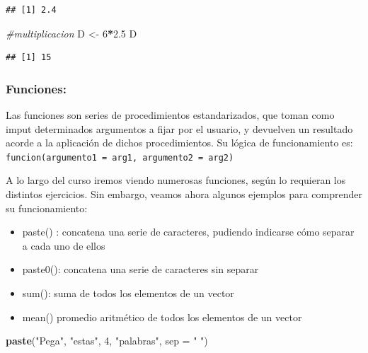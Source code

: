 \documentclass[]{book}
\newenvironment{Shaded}{\begin{snugshade}}{\end{snugshade}}
\newcommand{\CommentTok}[1]{\textcolor[rgb]{0.56,0.35,0.01}{\textit{#1}}}
\newcommand{\DataTypeTok}[1]{\textcolor[rgb]{0.13,0.29,0.53}{#1}}
\newcommand{\DecValTok}[1]{\textcolor[rgb]{0.00,0.00,0.81}{#1}}
\newcommand{\FloatTok}[1]{\textcolor[rgb]{0.00,0.00,0.81}{#1}}
\newcommand{\KeywordTok}[1]{\textcolor[rgb]{0.13,0.29,0.53}{\textbf{#1}}}
\newcommand{\NormalTok}[1]{#1}
\newcommand{\OperatorTok}[1]{\textcolor[rgb]{0.81,0.36,0.00}{\textbf{#1}}}
\newcommand{\StringTok}[1]{\textcolor[rgb]{0.31,0.60,0.02}{#1}}
\providecommand{\tightlist}{%
  \setlength{\itemsep}{0pt}\setlength{\parskip}{0pt}}
\begin{document}
\begin{verbatim}
## [1] 2.4
\end{verbatim}

\begin{Shaded}
\begin{Highlighting}[]
\CommentTok{#multiplicacion}
\NormalTok{D <-}\StringTok{ }\DecValTok{6}\OperatorTok{*}\FloatTok{2.5}
\NormalTok{D}
\end{Highlighting}
\end{Shaded}

\begin{verbatim}
## [1] 15
\end{verbatim}

\hypertarget{funciones}{%
\subsubsection{Funciones:}\label{funciones}}

Las funciones son series de procedimientos estandarizados, que toman como imput determinados argumentos a fijar por el usuario, y devuelven un resultado acorde a la aplicación de dichos procedimientos. Su lógica de funcionamiento es:\\
\texttt{funcion(argumento1\ =\ arg1,\ argumento2\ =\ arg2)}

A lo largo del curso iremos viendo numerosas funciones, según lo requieran los distintos ejercicios. Sin embargo, veamos ahora algunos ejemplos para comprender su funcionamiento:

\begin{itemize}
\tightlist
\item
  paste() : concatena una serie de caracteres, pudiendo indicarse cómo separar a cada uno de ellos\\
\item
  paste0(): concatena una serie de caracteres sin separar
\item
  sum(): suma de todos los elementos de un vector\\
\item
  mean() promedio aritmético de todos los elementos de un vector
\end{itemize}

\begin{Shaded}
\begin{Highlighting}[]
\KeywordTok{paste}\NormalTok{(}\StringTok{"Pega"}\NormalTok{, }\StringTok{"estas"}\NormalTok{, }\DecValTok{4}\NormalTok{, }\StringTok{"palabras"}\NormalTok{, }\DataTypeTok{sep =} \StringTok{" "}\NormalTok{)}
\end{Highlighting}
\end{Shaded}
\end{document}
